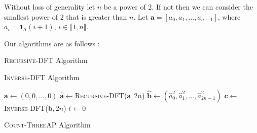 Without loss of generality let $n$ be a power of $2$. If not then we can consider the smallest power of $2$ that is greater than $n$. Let $\mathbf{a} = [a_0, a_1, \ldots, a_{n-1}]$, where $a_{i} = \mathbf{1}_{\mathcal{S}}(i+1)$, $i\in \lBrack 1,n\rBrack$.

Our algorithms are as follows :

\begin{algorithm}[H]
    \SetAlgoLined
    
    \caption{\textsc{Recursive-DFT} Algorithm}
\end{algorithm}

\begin{algorithm}[H]
    \SetAlgoLined

        \;
    \caption{\textsc{Inverse-DFT} Algorithm}
\end{algorithm}

\begin{algorithm}[H]
    \SetAlgoLined
        $\mathbf{a}\leftarrow (0,0,\ldots, 0)$
        $\hat{\mathbf{a}}\leftarrow$\textsc{Recursive-DFT}($\mathbf{a},2n$)\;
        $\hat{\mathbf{b}}\leftarrow (\hat{a}_0^2, \hat{a}_1^2,\ldots, \hat{a}_{2n-1}^2)$\;
        $\mathbf{c}\leftarrow$\textsc{Inverse-DFT}($\mathbf{b},2n$)\;
        $t \leftarrow 0$ \;
        \;
    \caption{\textsc{Count-ThreeAP} Algorithm}
\end{algorithm}

